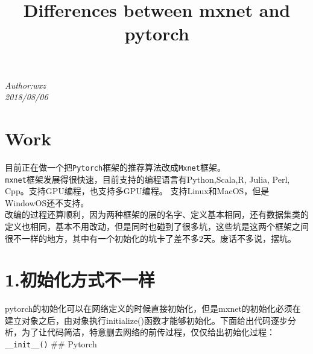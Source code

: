 \documentclass[11pt]{article}
\title{Differences between mxnet and pytorch}
\begin{document}
    \maketitle




    \emph{Author:wxz}\\
\emph{2018/08/06}

    \section{Work}\label{work}

目前正在做一个把\texttt{Pytorch}框架的推荐算法改成\texttt{Mxnet}框架。\\
\texttt{mxnet}框架发展得很快速，目前支持的编程语言有Python,Scala,R,
Julia, Perl, Cpp。支持GPU编程，也支持多GPU编程。
支持Linux和MacOS，但是WindowOS还不支持。\\
改编的过程还算顺利，因为两种框架的层的名字、定义基本相同，还有数据集类的定义也相同，基本不用改动，但是同时也碰到了很多坑，这些坑是这两个框架之间很不一样的地方，其中有一个初始化的坑卡了差不多2天。废话不多说，摆坑。

    \section{1.初始化方式不一样}\label{ux521dux59cbux5316ux65b9ux5f0fux4e0dux4e00ux6837}

pytorch的初始化可以在网络定义的时候直接初始化，但是mxnet的初始化必须在建立对象之后，由对象执行initialize()函数才能够初始化。下面给出代码逐步分析，为了让代码简洁，特意删去网络的前传过程，仅仅给出初始化过程：\texttt{\_\_init\_\_()}
\#\# Pytorch
\end{document}

